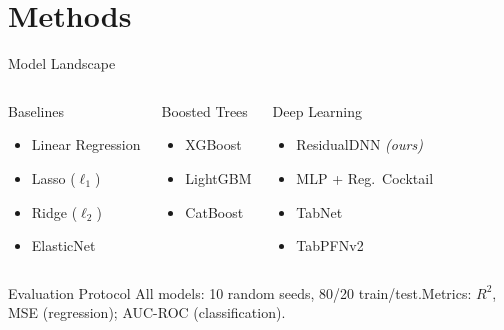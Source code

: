 \documentclass[aspectratio=169, 10pt]{beamer}
\begin{document}
\section{Methods}

\begin{frame}{Model Landscape}
\footnotesize
\begin{columns}[T,onlytextwidth]
\begin{block}{Baselines}
\vspace{-2pt}
\begin{itemize}\setlength\itemsep{2pt}
    \item Linear Regression
    \item Lasso ($\ell_1$)
    \item Ridge ($\ell_2$)
    \item ElasticNet
\end{itemize}
\vspace{-2pt}
\end{block}

\begin{block}{Boosted Trees}
\vspace{-2pt}
\begin{itemize}\setlength\itemsep{2pt}
    \item XGBoost \cite{chenXGBoostScalableTree2016}
    \item LightGBM \cite{keLightGBMHighlyEfficient}
    \item CatBoost \cite{prokhorenkovaCatBoostUnbiasedBoosting}
\end{itemize}
\vspace{-2pt}
\end{block}

\begin{block}{Deep Learning}
\vspace{-2pt}
\begin{itemize}\setlength\itemsep{2pt}
    \item ResidualDNN \textit{(ours)}
    \item MLP + Reg.\ Cocktail \cite{kadraWelltunedSimpleNets}
    \item TabNet \cite{arikTabNetAttentiveInterpretable2021}
    \item TabPFNv2 \cite{hollmannAccuratePredictionsSmall2025}
\end{itemize}
\vspace{-2pt}
\end{block}
\end{columns}

\vspace{2em}
\begin{block}{Evaluation Protocol}
All models: 10 random seeds, 80/20 train/test.\quad Metrics: $R^2$, MSE (regression); AUC-ROC (classification).
\end{block}
\end{frame}
\end{document}
